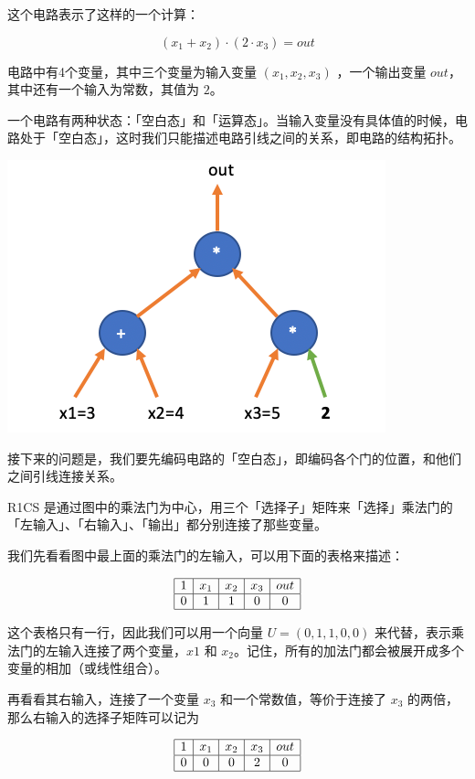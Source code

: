 这个电路表示了这样的一个计算：

\[
(x_1 + x_2) \cdot (2\cdot x_3) = out
\]

电路中有4个变量，其中三个变量为输入变量 \((x_1, x_2, x_3)\)
，一个输出变量 \(out\)，其中还有一个输入为常数，其值为 \(2\)。

一个电路有两种状态：「空白态」和「运算态」。当输入变量没有具体值的时候，电路处于「空白态」，这时我们只能描述电路引线之间的关系，即电路的结构拓扑。

\includegraphics{img/img20230414162845.png}

接下来的问题是，我们要先编码电路的「空白态」，即编码各个门的位置，和他们之间引线连接关系。

R1CS
是通过图中的乘法门为中心，用三个「选择子」矩阵来「选择」乘法门的「左输入」、「右输入」、「输出」都分别连接了那些变量。

我们先看看图中最上面的乘法门的左输入，可以用下面的表格来描述：

\[
\begin{array}{|c|c|c|c|c|}
\hline
1 & x_1 & x_2 & x_3 & out \\
\hline
0 & 1 & 1 & 0 & 0 \\
\hline
\end{array}
\]

这个表格只有一行，因此我们可以用一个向量 \(U=(0,1,1,0,0)\)
来代替，表示乘法门的左输入连接了两个变量，\(x1\) 和
\(x_2\)。记住，所有的加法门都会被展开成多个变量的相加（或线性组合）。

再看看其右输入，连接了一个变量 \(x_3\) 和一个常数值，等价于连接了
\(x_3\) 的两倍，那么右输入的选择子矩阵可以记为

\[
\begin{array}{|c|c|c|c|c|}
\hline
1 & x_1 & x_2 & x_3 & out \\
\hline
0 & 0 & 0 & 2 & 0 \\
\hline
\end{array}
\]

